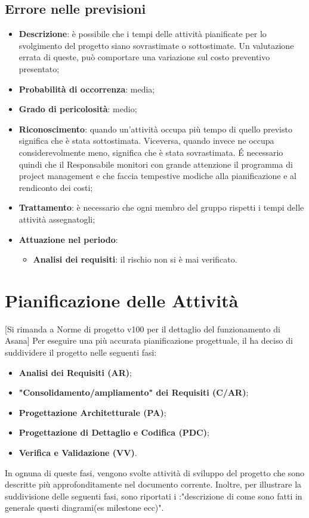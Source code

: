 		\subsection{Errore nelle previsioni}
		\begin{itemize}
			\item \textbf{Descrizione}: è possibile che i tempi delle attività pianificate per lo svolgimento del progetto siano sovrastimate o sottostimate. Un valutazione errata di queste, può comportare una variazione sul costo preventivo presentato; 
			\item \textbf{Probabilità di occorrenza}: media;
			\item \textbf{Grado di pericolosità}: medio;
			\item \textbf{Riconoscimento}: quando un'attività occupa più tempo di quello previsto significa che è stata sottostimata. Viceversa, quando invece ne occupa considerevolmente meno, significa che è stata sovrastimata. É necessario quindi che il Responsabile monitori con grande attenzione il programma di project management e che faccia tempestive modiche alla pianificazione e al rendiconto dei costi; 
			\item \textbf{Trattamento}: è necessario che ogni membro del gruppo rispetti i tempi delle attività assegnatogli; 
			\item \textbf{Attuazione nel periodo}:
			\begin{itemize}
				\item \textbf{Analisi dei requisiti}:  il rischio non si è mai verificato.
			\end{itemize}
		\end{itemize}
\section{Pianificazione delle Attività}
[Si rimanda a Norme di progetto v100 per il dettaglio del funzionamento di Asana]
Per eseguire una più accurata pianificazione progettuale, il  ha deciso di suddividere il progetto nelle seguenti fasi:
\begin{itemize}
	\item \textbf{Analisi dei Requisiti (AR)};
	\item \textbf{"Consolidamento/ampliamento" dei Requisiti (C/AR)};
	\item \textbf{Progettazione Architetturale (PA)};
	\item \textbf{Progettazione di Dettaglio e Codifica (PDC)};
	\item \textbf{Verifica e Validazione (VV)}.
\end{itemize}
In ognuna di queste fasi, vengono svolte attività di sviluppo del progetto che sono descritte più approfonditamente nel documento corrente.
Inoltre, per illustrare la suddivisione delle seguenti fasi, sono riportati i :"descrizione di come sono fatti in generale 
questi diagrami(es milestone ecc)".
